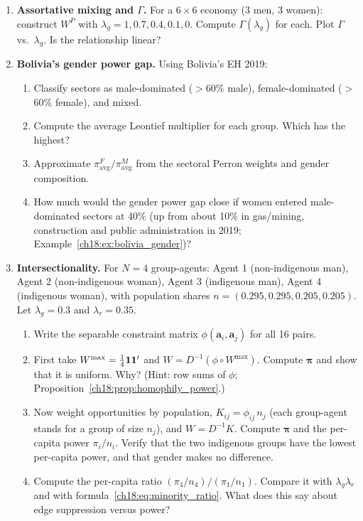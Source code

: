 \documentclass[../structural_economics_book.tex]{subfiles}
\begin{document}
\begin{enumerate}[label=\textbf{18.\arabic*}, leftmargin=3em]

\item \textbf{Assortative mixing and $\Gamma$.} For a $6 \times 6$ economy (3 men, 3 women): construct $W^P$ with $\lambda_g = 1, 0.7, 0.4, 0.1, 0$. Compute $\Gamma(\lambda_g)$ for each. Plot $\Gamma$ vs.\ $\lambda_g$. Is the relationship linear?

\item \textbf{Bolivia's gender power gap.} Using Bolivia's EH 2019:
\begin{enumerate}
\item Classify sectors as male-dominated ($>$60\% male), female-dominated ($>$60\% female), and mixed.
\item Compute the average Leontief multiplier for each group. Which has the highest?
\item Approximate $\pi^F_{\text{avg}}/\pi^M_{\text{avg}}$ from the sectoral Perron weights and gender composition.
\item How much would the gender power gap close if women entered male-dominated sectors at 40\% (up from about 10\% in gas/mining, construction and public administration in 2019; Example~\ref{ch18:ex:bolivia_gender})?
\end{enumerate}

\item \textbf{Intersectionality.} For $N = 4$ group-agents: Agent 1 (non-indigenous man), Agent 2 (non-indigenous woman), Agent 3 (indigenous man), Agent 4 (indigenous woman), with population shares $n = (0.295, 0.295, 0.205, 0.205)$. Let $\lambda_g = 0.3$ and $\lambda_r = 0.35$.
\begin{enumerate}
\item Write the separable constraint matrix $\phi(\mathbf{a}_i, \mathbf{a}_j)$ for all 16 pairs.
\item First take $W^{\max} = \frac{1}{4}\mathbf{1}\mathbf{1}'$ and $W = D^{-1}(\phi \circ W^{\max})$. Compute $\boldsymbol{\pi}$ and show that it is uniform. Why? (Hint: row sums of $\phi$; Proposition~\ref{ch18:prop:homophily_power}.)
\item Now weight opportunities by population, $K_{ij} = \phi_{ij}\, n_j$ (each group-agent stands for a group of size $n_j$), and $W = D^{-1}K$. Compute $\boldsymbol{\pi}$ and the per-capita power $\pi_i/n_i$. Verify that the two indigenous groups have the lowest per-capita power, and that gender makes no difference.
\item Compute the per-capita ratio $(\pi_4/n_4)/(\pi_1/n_1)$. Compare it with $\lambda_g \lambda_r$ and with formula~\eqref{ch18:eq:minority_ratio}. What does this say about edge suppression versus power?
\end{enumerate}


\end{enumerate}
\end{document}

